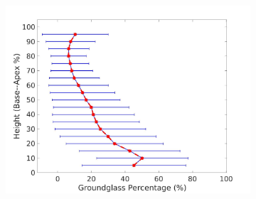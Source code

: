 \begin{figure}[H] 
\centering
\begin{subfigure}{.4\linewidth}%
  \includegraphics[width=\linewidth,trim={{.0\wd0} {.0\wd0} {.0\wd0} {.0\wd0}},clip]{QuantitativeAnalysis/Image/LeftLungGroundglassDiseaseAgainstHeight.jpg} %
  \caption{}
  \label{fig:DiseaseAgainstHeight-a} 
\end{subfigure} 
\begin{subfigure}{.4\linewidth}%

\end{subfigure}
\end{figure}
